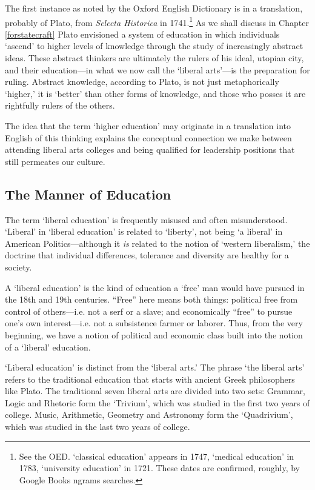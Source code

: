 The first instance as noted by the Oxford English Dictionary is in a translation, probably of Plato, from \emph{Selecta Historica} in 1741.\footnote{See the OED. `classical education' appears in 1747, `medical education' in 1783, `university education' in 1721. These dates are confirmed, roughly, by Google Books ngrams searches.} As we shall discuss in Chapter \ref{forstatecraft} Plato envisioned a system of education in which individuals `ascend' to higher levels of knowledge through the study of increasingly abstract ideas. These abstract thinkers are ultimately the rulers of his ideal, utopian city, and their education---in what we now call the `liberal arts'---is the preparation for ruling. Abstract knowledge, according to Plato, is not just metaphorically `higher,' it is `better' than other forms of knowledge, and those who posses it are rightfully rulers of the others. 

The idea that the term `higher education' may originate in a translation into English of this thinking explains the conceptual connection we make between attending liberal arts colleges and being qualified for leadership positions that still permeates our culture.

\subsection{The Manner of Education}
\label{themannerofeducation}

The term `liberal education' is frequently misused and often misunderstood. `Liberal' in `liberal education' is related to `liberty', not being `a liberal' in American Politics---although it \emph{is} related to the notion of `western liberalism,' the doctrine that individual differences, tolerance and diversity are healthy for a society. 

A `liberal education' is the kind of education a `free' man would have pursued in the 18th and 19th centuries. ``Free'' here means both things: political free from control of others---i.e. not a serf or a slave; and economically ``free'' to pursue one's own interest---i.e. not a subsistence farmer or laborer. Thus, from the very beginning, we have a notion of political and economic class built into the notion of a `liberal' education.

`Liberal education' is distinct from the `liberal arts.' The phrase `the liberal arts' refers to the traditional education that starts with ancient Greek philosophers like Plato. The traditional seven liberal arts are divided into two sets: Grammar, Logic and Rhetoric form the `Trivium', which was studied in the first two years of college. Music, Arithmetic, Geometry and Astronomy form the `Quadrivium', which was studied in the last two years of college.

